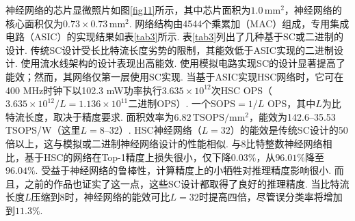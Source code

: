 \documentclass{solitairemiya-art}
\begin{document}
神经网络的芯片显微照片如图\ref{fig11}所示，其中芯片面积为$1.0 \, \mathrm{mm}^2$，神经网络的核心面积仅为$0.73 \times 0.73 \, \mathrm{mm}^2$. 网络结构由4544个乘累加（MAC）组成，专用集成电路（ASIC）的实现结果如表\ref{tab3}所示. 表\ref{tab3}列出了几种基于SC或二进制的设计. 传统SC设计\cite{ref30, ref31, ref32}受长比特流长度劣势的限制，其能效低于ASIC实现的二进制设计. 使用流水线架构的设计\cite{ref33}表现出高能效. 使用模拟电路实现SC的设计\cite{ref34}显著提高了能效；然而，其网络仅第一层使用SC实现. 当基于ASIC实现HSC网络时，它可在400 MHz时钟下以102.3 mW功率执行$3.635 \times 10^{12}$次HSC OPS（$3.635 \times 10^{12}/L = 1.136 \times 10^{11}$二进制OPS）. 一个$\mathrm{SOPS} = 1/L$ OPS，其中$L$为比特流长度，取决于精度要求. 面积效率为$6.82 \, \mathrm{TSOPS}/\mathrm{mm}^2$，能效为142.6--35.53 TSOPS/W（这里$L = 8$--32）. HSC神经网络（$L = 32$）的能效是传统SC设计的50倍以上，这与模拟或二进制神经网络设计的性能相似. 与8比特整数神经网络相比，基于HSC的网络在Top-1精度上损失很小，仅下降$0.03\%$，从$96.01\%$降至$96.04\%$. 受益于神经网络的鲁棒性，计算精度上的小牺牲对推理精度影响很小. 而且，之前的作品\cite{ref30, ref31, ref32, ref33, ref34}也证实了这一点，这些SC设计都取得了良好的推理精度. 当比特流长度$L$压缩到8时，神经网络的能效可比$L = 32$时提高四倍，尽管误分类率将增加到$11.3\%$. 
\end{document}
